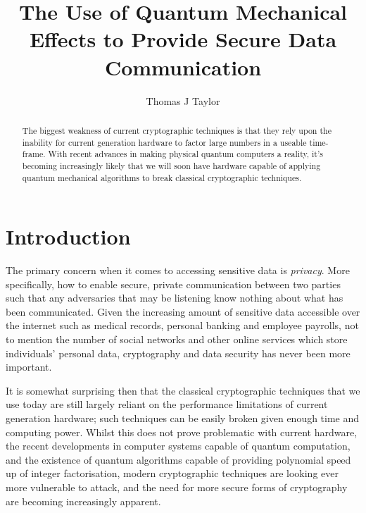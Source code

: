 \documentclass[runningheads,a4paper]{llncs}
\begin{document}
\mainmatter  

\title{The Use of Quantum Mechanical Effects to Provide Secure Data Communication}
\author{Thomas J Taylor\\ \mail}

\maketitle

\begin{abstract}
The biggest weakness of current cryptographic techniques is that they rely upon the inability for current generation hardware to factor large numbers in a useable time-frame. With recent advances in making physical quantum computers a reality, it's becoming increasingly likely that we will soon have hardware capable of applying quantum mechanical algorithms to break classical cryptographic techniques.
\end{abstract}

\section{Introduction}

The primary concern when it comes to accessing sensitive data is \emph{privacy}. More specifically, how to enable secure, private communication between two parties such that any adversaries that may be listening know nothing about what has been communicated\cite{Rivest:1990fk}. Given the increasing amount of sensitive data accessible over the internet such as medical records, personal banking and employee payrolls, not to mention the number of social networks and other online services which store individuals' personal data, cryptography and data security has never been more important.

It is somewhat surprising then that the classical cryptographic techniques that we use today are still largely reliant on the performance limitations of current generation hardware; such techniques can be easily broken given enough time and computing power. Whilst this does not prove problematic with current hardware, the recent developments in computer systems capable of quantum computation, and the existence of quantum algorithms capable of providing polynomial speed up of integer factorisation\cite{Shor:1994fk}, modern cryptographic techniques are looking ever more vulnerable to attack, and the need for more secure forms of cryptography are becoming increasingly apparent.
\end{document}
